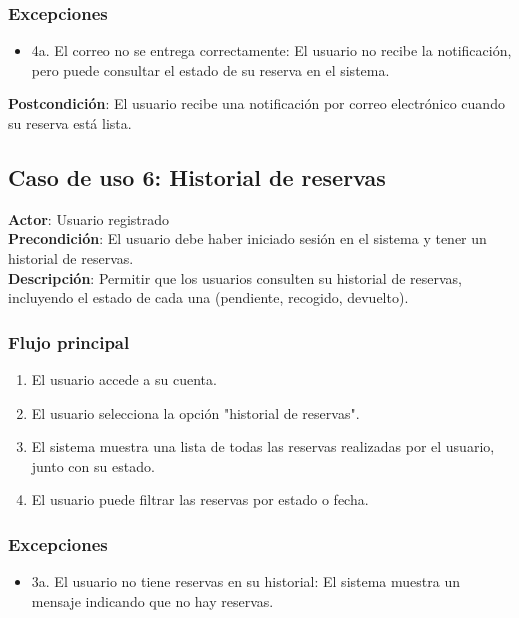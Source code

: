\documentclass{scrreprt}
\begin{document}
\subsubsection{Excepciones}
\begin{itemize}
    \item 4a. El correo no se entrega correctamente: El usuario no recibe la notificación, pero puede consultar el estado de su reserva en el sistema.
\end{itemize}

\textbf{Postcondición}: El usuario recibe una notificación por correo electrónico cuando su reserva está lista.

\subsection{Caso de uso 6: Historial de reservas}
\textbf{Actor}: Usuario registrado \\
\textbf{Precondición}: El usuario debe haber iniciado sesión en el sistema y tener un historial de reservas. \\
\textbf{Descripción}: Permitir que los usuarios consulten su historial de reservas, incluyendo el estado de cada una (pendiente, recogido, devuelto).

\subsubsection{Flujo principal}
\begin{enumerate}
    \item El usuario accede a su cuenta.
    \item El usuario selecciona la opción "historial de reservas".
    \item El sistema muestra una lista de todas las reservas realizadas por el usuario, junto con su estado.
    \item El usuario puede filtrar las reservas por estado o fecha.
\end{enumerate}

\subsubsection{Excepciones}
\begin{itemize}
    \item 3a. El usuario no tiene reservas en su historial: El sistema muestra un mensaje indicando que no hay reservas.
\end{itemize}
\end{document}
